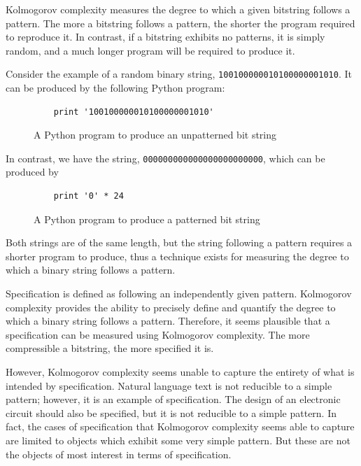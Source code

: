 Kolmogorov complexity measures the degree to which a given bitstring follows a pattern.
The more a bitstring follows a pattern, the shorter the program required to reproduce it.
In contrast, if a bitstring exhibits no patterns, it is simply random, and a much longer program will be required to produce it.

Consider the example of a random binary string, {\tt 100100000010100000001010}.
It can be produced by the following Python program:

\begin{figure}[H]
\begin{mdframed}
\begin{verbatim}
    print '100100000010100000001010'
\end{verbatim}
\end{mdframed}
\caption{A Python program to produce an unpatterned bit string}
\end{figure}

In contrast, we have the string, {\tt 000000000000000000000000}, which can be produced by

\begin{figure}[H]
\begin{mdframed}
\begin{verbatim}
    print '0' * 24
\end{verbatim}
\end{mdframed}
\caption{A Python program to produce a patterned bit string}
\end{figure}

Both strings are of the same length, but the string following a pattern requires a shorter program to produce,
thus a technique exists for measuring the degree to which a binary string follows a pattern.

Specification is defined as following an independently given pattern.
Kolmogorov complexity provides the ability to precisely define and quantify the degree to which a binary string follows a pattern.
Therefore, it seems plausible that a specification can be measured using Kolmogorov complexity.
The more compressible a bitstring, the more specified it is.

However, Kolmogorov complexity seems unable to capture the entirety of what is intended by specification.
Natural language text is not reducible to a simple pattern; however, it is an example of specification.
The design of an electronic circuit should also be specified, but it is not reducible to a simple pattern.
In fact, the cases of specification that Kolmogorov complexity seems able to capture are limited to objects which exhibit some very simple pattern.
But these are not the objects of most interest in terms of specification.

